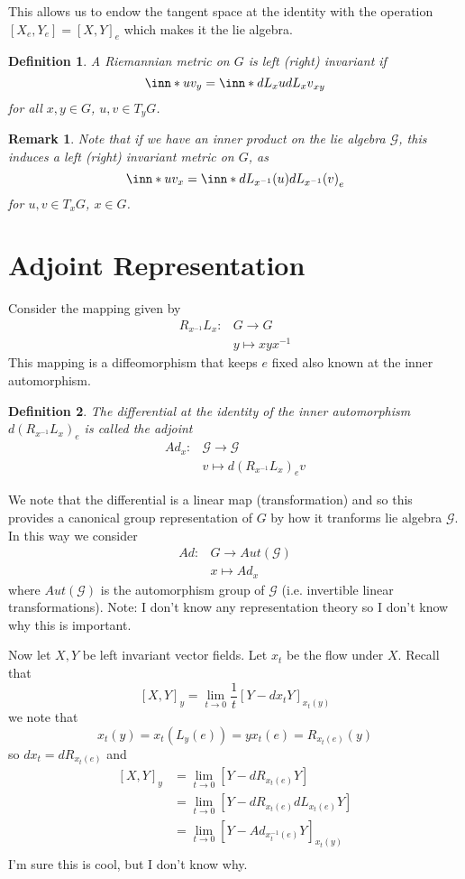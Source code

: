 \documentclass[a4paper]{article}
\newtheorem*{defn}{Definition}
\newtheorem*{rem}{Remark}
\begin{document}
This allows us to endow the tangent space at the identity with the operation $[X_e, Y_e] = [X,Y]_e$ which makes it the lie algebra.

\begin{defn}
  A Riemannian metric on $G$ is left (right) invariant  if
  \[
    \inn*{u}{v}_y = \inn*{dL_x u}{dL_x v}_{xy}
  \]
  for all $x,y \in G$, $u,v \in T_yG$.
\end{defn}

\begin{rem}
  Note that if we have an inner product on the lie algebra $\mathcal{G}$, this induces a left (right) invariant metric on $G$, as
  \[
    \inn*{u}{v}_x = \inn*{dL_{x^{-1}}(u)}{dL_{x^{-1}}(v)}_e
  \]
  for $u,v \in T_xG$, $x \in G$.
\end{rem}

\section*{Adjoint Representation}%

Consider the mapping given by
\[
  \begin{aligned}
    R_{x^{-1}}L_x: &G \rightarrow G \\
                   &y \mapsto xyx^{-1}
  \end{aligned}
\]
This mapping is a diffeomorphism that keeps $e$ fixed also known at the inner automorphism. 
\begin{defn}
The differential at the identity  of the inner automorphism $d(R_{x^{-1}}L_x)_e$  is called the adjoint
\[
  \begin{aligned}
    Ad_x: &\mathcal{G} \rightarrow \mathcal{G} \\
          &v \mapsto d(R_{x^{-1}}L_x)_ev
  \end{aligned}
\]
\end{defn}

We note that the differential is a linear map (transformation) and so this provides a canonical group representation of $G$ by how it tranforms lie algebra $\mathcal{G}$. In this way we consider
\[
  \begin{aligned}
    Ad: &G \rightarrow Aut(\mathcal{G}) \\
        &x \mapsto Ad_x
  \end{aligned}
\]
where $Aut(\mathcal{G})$ is the automorphism group of $\mathcal{G}$ (i.e. invertible linear transformations). 
Note: I don't know any representation theory so I don't know why this is important. 

Now let $X,Y$ be left invariant vector fields. Let $x_t$ be the flow under $X$. Recall that
\[
  [X,Y]_y = \lim_{t \rightarrow 0} \frac{1}{t} \left[Y - dx_t Y \right]_{x_t(y)}
\]
we note that
\[
  x_t(y) = x_t(L_y(e)) = yx_t(e) = R_{x_t(e)}(y)
\]
so $dx_t = dR_{x_t(e)}$ and
\[
  \begin{aligned}
    [X,Y]_y &= \lim_{t \rightarrow 0} \left[Y - dR_{x_t(e)}Y\right] \\
          &= \lim_{t \rightarrow 0} \left[Y - dR_{x_t(e)}dL_{x_t(e)}Y\right] \\
          &= \lim_{t \rightarrow 0} \left[Y - Ad_{x_t^{-1}(e)}Y\right]_{x_t(y)} \\
  \end{aligned}
\]
I'm sure this is cool, but I don't know why.
\end{document}
